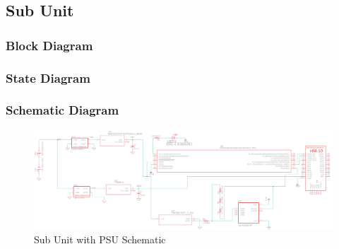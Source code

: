 \subsection{Sub Unit}
\subsubsection{Block Diagram}
\subsubsection{State Diagram}
\begin{landscape}
\subsubsection{Schematic Diagram}
  \begin{center}
  \begin{figure}[H]
    \includegraphics[width=\pdfpagewidth,height=0.65\textheight]{../Modular Design/Sub-Unit/Figures/sub-unit-and-psu.png}
    \caption{Sub Unit with PSU Schematic}
    \label{fig:sub-with-psu-schematic}
  \end{figure}
  \end{center}
  \end{landscape}
